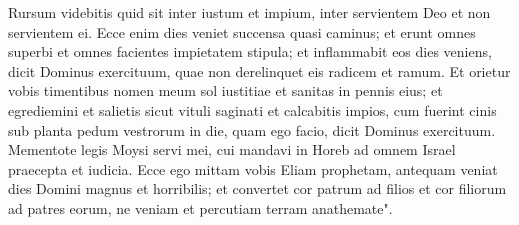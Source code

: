 \begin{biblechapter}
\verse Rursum videbitis quid sit inter iustum et impium, inter servientem Deo et non servientem ei. 
\verse Ecce enim dies veniet succensa quasi caminus; et erunt omnes superbi et omnes facientes impietatem stipula; et inflammabit eos dies veniens, dicit Dominus exercituum, quae non derelinquet eis radicem et ramum. 
\verse Et orietur vobis timentibus nomen meum sol iustitiae et sanitas in pennis eius; et egrediemini et salietis sicut vituli saginati 
\verse et calcabitis impios, cum fuerint cinis sub planta pedum vestrorum in die, quam ego facio, dicit Dominus exercituum. 
\verse Mementote legis Moysi servi mei, cui mandavi in Horeb ad omnem Israel praecepta et iudicia. 
\verse Ecce ego mittam vobis Eliam prophetam, antequam veniat dies Domini magnus et horribilis; 
\verse et convertet cor patrum ad filios et cor filiorum ad patres eorum, ne veniam et percutiam terram anathemate".    
\end{biblechapter}

